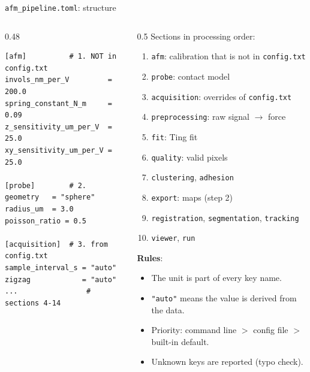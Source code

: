 \documentclass[aspectratio=169,9pt]{beamer}
\begin{document}
\begin{frame}[fragile]{\texttt{afm\_pipeline.toml}: structure}
\begin{columns}[T]
\begin{column}{0.48\textwidth}
\begin{lstlisting}
[afm]          # 1. NOT in config.txt
invols_nm_per_V         = 200.0
spring_constant_N_m     = 0.09
z_sensitivity_um_per_V  = 25.0
xy_sensitivity_um_per_V = 25.0

[probe]        # 2.
geometry   = "sphere"
radius_um  = 3.0
poisson_ratio = 0.5

[acquisition]  # 3. from config.txt
sample_interval_s = "auto"
zigzag            = "auto"
...                # sections 4-14
\end{lstlisting}
\end{column}
\begin{column}{0.5\textwidth}\footnotesize
Sections in processing order:
\begin{enumerate}\setlength\itemsep{0pt}
\item \texttt{afm}: calibration that is not in \texttt{config.txt}
\item \texttt{probe}: contact model
\item \texttt{acquisition}: overrides of \texttt{config.txt}
\item \texttt{preprocessing}: raw signal $\to$ force
\item \texttt{fit}: Ting fit
\item \texttt{quality}: valid pixels
\item \texttt{clustering}, \texttt{adhesion}
\item \texttt{export}: maps (step 2)
\item \texttt{registration}, \texttt{segmentation}, \texttt{tracking}
\item \texttt{viewer}, \texttt{run}
\end{enumerate}
\textbf{Rules}:
\begin{itemize}
\item The unit is part of every key name.
\item \texttt{"auto"} means the value is derived from the data.
\item Priority: command line $>$ config file $>$ built-in default.
\item Unknown keys are reported (typo check).
\end{itemize}
\end{column}
\end{columns}
\end{frame}
\end{document}

